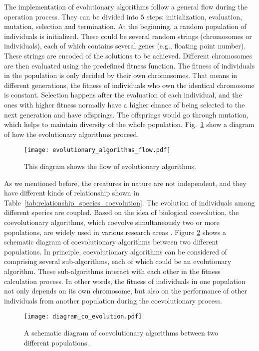 The implementation of evolutionary algorithms follow a general flow during the operation process. They can be divided into $5$ steps: initialization, evaluation, mutation, selection and termination. At the beginning, a random population of individuals is initialized. These could be several random strings (chromosomes or individuals), each of which contains several genes (e.g., floating point number). These strings are encoded of the solutions to be achieved. Different chromosomes are then evaluated using the predefined fitness function. The fitness of individuals in the population is only decided by their own chromosomes. That means in different generations, the fitness of individuals who own the identical chromosome is constant. Selection happens after the evaluation of each individual, and the ones with higher fitness normally have a higher chance of being selected to the next generation and have offsprings. The offsprings would go through mutation, which helps to maintain diversity of the whole population.  Fig.~\ref{fig:evolutionary_algorithms_flow} show a diagram of how the evolutionary algorithms proceed. 

\begin{figure}[htbp]
  \centering
  \texttt{[image: evolutionary\_algorithms\_flow.pdf]}
  \caption{This diagram shows the flow of evolutionary algorithms.}
  \label{fig:evolutionary_algorithms_flow}
\end{figure}

As we mentioned before, the creatures in nature are not independent, and they have different kinds of relationship shown in Table~\ref{tab:relationship_species_coevolution}. The evolution of individuals among different species are coupled. Based on the idea of biological coevolution, the coevolutionary algorithms, which coevolve simultaneously two or more populations, are widely used in various research areas \cite{Rosin_1997}. Figure \ref{Fig: diagram_coevolution} shows a schematic diagram of coevolutionary algorithms between two different populations. In principle, coevolutionary algorithms can be considered of comprising several sub-algorithms, each of which could be an evolutionary algorithm. These sub-algorithms interact with each other in the fitness calculation process. In other words, the fitness of individuals in one population not only depends on its own chromosome, but also on the performance of other individuals from another population during the coevolutionary process. 

\begin{figure}[htbp]
  \centering
  \texttt{[image: diagram\_co\_evolution.pdf]}
  \caption{A schematic diagram of coevolutionary algorithms between two different populations.}
  \label{Fig: diagram_coevolution}
\end{figure}

